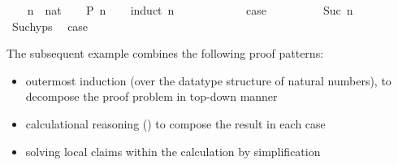 \begin{isabellebody}
\begin{isamarkuptext}
\begin{itemize}
  \end{itemize}%
\end{isamarkuptext}%
\isamarkuptrue%
\isamarkupfalse%
\isanewline
{}\isanewline
%
\isadelimproof
\ \ %
\endisadelimproof
%
\isatagproof
{}\isamarkupfalse%
\ n\ {}{}\ nat\isanewline
\ \ \isamarkupfalse%
\ {}P\ n{}\isanewline
\ \ \isamarkupfalse%
\ {}induct\ n{}\isanewline
\ \ \ \ \isamarkupfalse%
\ {}\isanewline
\ \ \ \ \isamarkupfalse%
\ {}case\ \isamarkupfalse%
\isanewline
\ \ \isamarkupfalse%
\isanewline
\ \ \ \ \isamarkupfalse%
\ {}Suc\ n{}\isanewline
\ \ \ \ \isamarkupfalse%
\ Suc{}hyps\ \isamarkupfalse%
\ {}case\ \isamarkupfalse%
\isanewline
\ \ \isamarkupfalse%
%
\endisatagproof
{\isafoldproof}%
%
\isadelimproof
\isanewline
%
\endisadelimproof
{}\isamarkupfalse%
%
\isamarkuptrue%
%
\begin{isamarkuptext}%
The subsequent example combines the following proof patterns:
  \begin{itemize}

  \item outermost induction (over the datatype structure of natural
  numbers), to decompose the proof problem in top-down manner

  \item calculational reasoning ()
  to compose the result in each case

  \item solving local claims within the calculation by simplification


\end{itemize}
\end{isamarkuptext}
\end{isabellebody}
